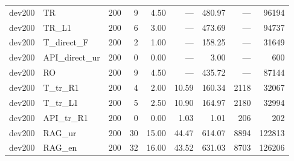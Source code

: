 \begin{table}[t]
\begin{tabular}{llrrrrrrr}
dev200 & TR & 200 & 9 & 4.50 & — & 480.97 & — & 96194 \\
dev200 & TR\_L1 & 200 & 6 & 3.00 & — & 473.69 & — & 94737 \\
dev200 & T\_direct\_F & 200 & 2 & 1.00 & — & 158.25 & — & 31649 \\
dev200 & API\_direct\_ur & 200 & 0 & 0.00 & — & 3.00 & — & 600 \\
dev200 & RO & 200 & 9 & 4.50 & — & 435.72 & — & 87144 \\
dev200 & T\_tr\_R1 & 200 & 4 & 2.00 & 10.59 & 160.34 & 2118 & 32067 \\
dev200 & T\_tr\_L1 & 200 & 5 & 2.50 & 10.90 & 164.97 & 2180 & 32994 \\
dev200 & API\_tr\_R1 & 200 & 0 & 0.00 & 1.03 & 1.01 & 206 & 202 \\
dev200 & RAG\_ur & 200 & 30 & 15.00 & 44.47 & 614.07 & 8894 & 122813 \\
dev200 & RAG\_en & 200 & 32 & 16.00 & 43.52 & 631.03 & 8703 & 126206 \\
\bottomrule
\end{tabular}
\end{table}
